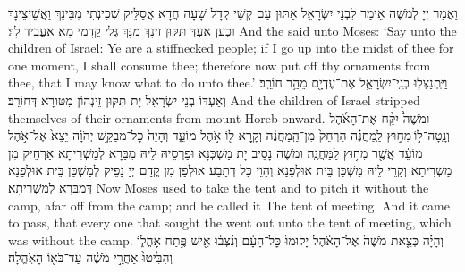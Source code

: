 {וַאֲמַר יְיָ לְמֹשֶׁה אֵימַר לִבְנֵי יִשְׂרָאֵל אַתּוּן עַם קְשֵׁי קְדָל שָׁעָה חֲדָא אֲסַלֵּיק שְׁכִינְתִי מִבֵּינָךְ וַאֲשֵׁיצֵינָךְ וּכְעַן אַעְדְּ תִּקּוּן זֵינָךְ מִנָּךְ גְּלֵי קֳדָמַי מָא אַעֲבֵיד לָךְ׃}
{And the \lord\space said unto Moses: ‘Say unto the children of Israel: Ye are a stiffnecked people; if I go up into the midst of thee for one moment, I shall consume thee; therefore now put off thy ornaments from thee, that I may know what to do unto thee.’}{}
{וַיִּֽתְנַצְּל֧וּ בְנֵֽי־יִשְׂרָאֵ֛ל אֶת־עֶדְיָ֖ם מֵהַ֥ר חוֹרֵֽב׃
}
{וְאַעְדּוֹ בְנֵי יִשְׂרָאֵל יָת תִּקּוּן זֵינְהוֹן מִטּוּרָא דְּחוֹרֵב׃}
{And the children of Israel stripped themselves of their ornaments from mount Horeb onward.}{}
{וּמֹשֶׁה֩ יִקַּ֨ח אֶת־הָאֹ֜הֶל וְנָֽטָה־ל֣וֹ \legarmeh  מִח֣וּץ לַֽמַּחֲנֶ֗ה הַרְחֵק֙ מִן־הַֽמַּחֲנֶ֔ה וְקָ֥רָא ל֖וֹ אֹ֣הֶל מוֹעֵ֑ד וְהָיָה֙ כׇּל־מְבַקֵּ֣שׁ יְהֹוָ֔ה יֵצֵא֙ אֶל־אֹ֣הֶל מוֹעֵ֔ד אֲשֶׁ֖ר מִח֥וּץ לַֽמַּחֲנֶֽה׃
}
{וּמֹשֶׁה נָסֵיב יָת מַשְׁכְּנָא וּפַרְסֵיהּ לֵיהּ מִבַּרָא לְמַשְׁרִיתָא אַרְחֵיק מִן מַשְׁרִיתָא וְקָרֵי לֵיהּ מַשְׁכַּן בֵּית אוּלְפָנָא וְהָוֵי כָּל דְּתָבַע אוּלְפָן מִן קֳדָם יְיָ נָפֵיק לְמַשְׁכַּן בֵּית אוּלְפָנָא דְּמִבַּרָא לְמַשְׁרִיתָא׃}
{Now Moses used to take the tent and to pitch it without the camp, afar off from the camp; and he called it The tent of meeting. And it came to pass, that every one that sought the \lord\space went out unto the tent of meeting, which was without the camp.}{}
{וְהָיָ֗ה כְּצֵ֤את מֹשֶׁה֙ אֶל־הָאֹ֔הֶל יָק֙וּמוּ֙ כׇּל־הָעָ֔ם וְנִ֨צְּב֔וּ אִ֖ישׁ פֶּ֣תַח אׇהֳל֑וֹ וְהִבִּ֙יטוּ֙ אַחֲרֵ֣י מֹשֶׁ֔ה עַד־בֹּא֖וֹ הָאֹֽהֱלָה׃
}
